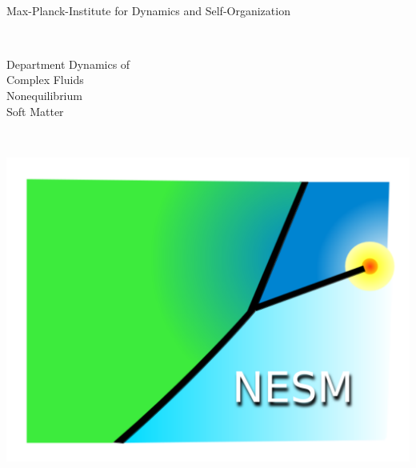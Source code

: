 \begin{titlepage}
\normalsize
\HRule \\
\begin{minipage}{0.34\textwidth}
\begin{flushleft} 
{Max-Planck-Institute for Dynamics and Self-Organization}%
\end{flushleft}
\end{minipage}
~
\begin{minipage}{0.4471\textwidth}
\begin{flushright} 
\vspace{2.5pt}
{\footnotesize Department Dynamics of\\Complex Fluids\\[2.5mm]
Nonequilibrium\\Soft Matter}
\end{flushright}
\end{minipage}
~
\begin{minipage}{0.165\textwidth}
\begin{flushright} 
\includegraphics[trim=26 26 30 33, clip, width=\textwidth]{pics/nesm_logo.pdf}
\end{flushright}
\end{minipage}%

\end{titlepage}
\restoregeometry
